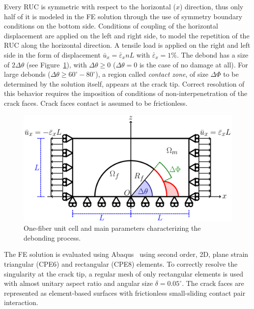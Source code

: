 \documentclass[12pt,a4paper]{article}
\begin{document}
Every RUC is symmetric with respect to the horizontal ($x$) direction, thus only half of it is modeled in the FE solution through the use of symmetry boundary conditions on the bottom side. Conditions of coupling of the horizontal displacement are applied on the left and right side, to model the repetition of the RUC along the horizontal direction. A tensile load is applied on the right and left side in the form of displacement $\bar{u}_{x}=\bar{\varepsilon}_{x}nL$ with $\bar{\varepsilon}_{x}=1\%$. The debond has a size of $2\Delta\theta$ (see Figure~\ref{fig:ruc}), with $\Delta\theta\geq0$ ($\Delta\theta=0$ is the case of no damage at all). For large debonds ($\Delta\theta\geq 60^{\circ}-80^{\circ}$), a region called \emph{contact zone}, of size $\Delta\Phi$ to be determined by the solution itself, appears at the crack tip. Correct resolution of this behavior requires the imposition of conditions of non-interpenetration of the crack faces. Crack faces contact is assumed to be frictionless.

\begin{figure}[!h]
\centering
        \includegraphics[height=0.25\textheight]{RUC.pdf}
\caption{One-fiber unit cell and main parameters characterizing the debonding process.}\label{fig:ruc}
\end{figure}

The FE solution is evaluated using Abaqus~\cite{abq12} using second order, 2D, plane strain triangular (CPE6) and rectangular (CPE8) elements. To correctly resolve the singularity at the crack tip, a regular mesh of only rectangular elements is used with almost unitary aspect ratio and angular size $\delta=0.05^{\circ}$. The crack faces are represented as element-based surfaces with frictionless small-sliding contact pair interaction.
\end{document}
